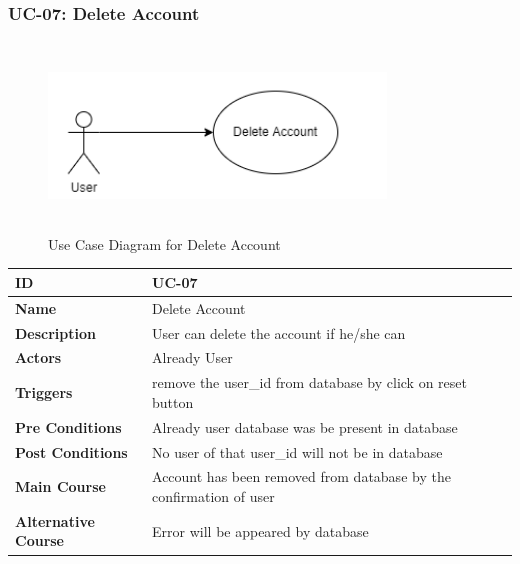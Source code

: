 \subsubsection{UC-07: Delete Account}
\begin{figure}[H]
    \includegraphics[height=5cm, width=0.8\textwidth]{./diagrams/Use Case/u7.png}
    \centering
    \caption{Use Case Diagram for Delete Account}
    \label{fig:Usecase1}
\end{figure}

\begin{center}
    \begin{tabularx}{\textwidth}{|l|X|}
        \hline
        \textbf{ID}                 & UC-07                                                              \\
        \hline
        \textbf{Name}               & Delete Account                                                     \\
        \hline
        \textbf{Description}        & User can delete the account if he/she can                          \\
        \hline
        \textbf{Actors}             & Already User                                                       \\
        \hline
        \textbf{Triggers}           & remove the user\_id from database by click on reset button         \\
        \hline
        \textbf{Pre Conditions}     & Already user database was be present in database                   \\
        \hline
        \textbf{Post Conditions}    & No user of that user\_id will not be in database                   \\
        \hline
        \textbf{Main Course}        & Account has been removed from database by the confirmation of user \\
        \hline
        \textbf{Alternative Course} & Error will be appeared by database                                 \\
        \hline
    \end{tabularx}
\end{center}
\newpage



